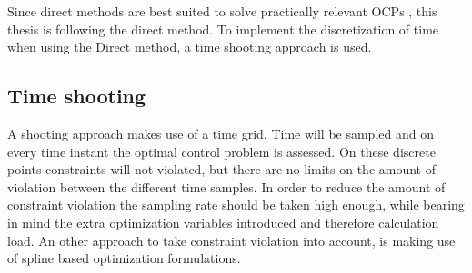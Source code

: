 Since direct methods are best suited to solve practically relevant OCPs \cite{Mercy2018}, this thesis is following the direct method. To implement the discretization of time when using the Direct method, a time shooting approach is used.

\subsection{Time shooting}
A shooting approach makes use of a time grid. Time will be sampled and on every time instant the optimal control problem is assessed. On these discrete points constraints will not violated, but there are no limits on the amount of violation between the different time samples. In order to reduce the amount of constraint violation the sampling rate should be taken high enough, while bearing in mind the extra optimization variables introduced and therefore calculation load. An other approach to take constraint violation into account, is making use of spline based optimization formulations. \cite{Mercy2018}\\

